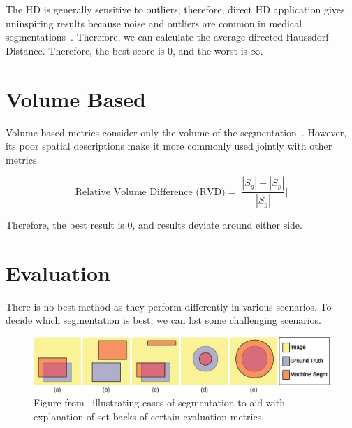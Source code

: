 \documentclass[11pt,twoside]{report}
\begin{document}
The HD is generally sensitive to outliers; therefore, direct HD application gives uninspiring results because noise and outliers are common in medical segmentations~\cite{boundary-overlap-metrics}. Therefore, we can calculate the average directed Haussdorf Distance. Therefore, the best score is 0, and the worst is $\infty$.

\clearpage

\section{Volume Based}

Volume-based metrics consider only the volume of the segmentation~\cite{evaluation-of-metrics-in-prostate,review-metrics, boundary-overlap-metrics}. However, its poor spatial descriptions make it more commonly used jointly with other metrics.

\begin{equation*}
 \text{Relative Volume Difference (RVD)} = \bigg| \frac{|S_g|-|S_p|}{|S_g|}\bigg|
\end{equation*}

Therefore, the best result is 0, and results deviate around either side.

\section{Evaluation}\label{sect:evaluation-of-evaluation-methods}

There is no best method as they perform differently in various scenarios. To decide which segmentation is best, we can list some challenging scenarios.

\begin{figure}[H]
  \centering
  \includegraphics[width=\linewidth]{../figures/segmentation-cases-1.png}
  \caption{Figure from~\cite{boundary-overlap-metrics} illustrating cases of segmentation to aid with explanation of set-backs of certain evaluation metrics.}\label{fig:segmentation-cases-1}
\end{figure}
\end{document}

